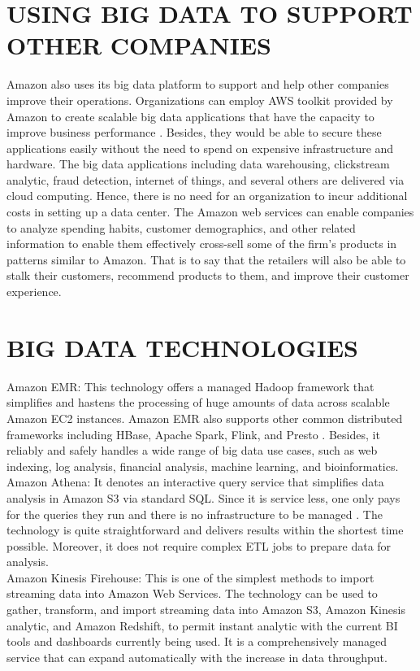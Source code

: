 \documentclass[sigconf]{acmart}
\begin{document}
\section{USING BIG DATA TO SUPPORT OTHER COMPANIES}
Amazon also uses its big data platform to support and help other companies improve their operations. Organizations can employ AWS toolkit provided by Amazon to create scalable big data applications that have the capacity to improve business performance \cite{1}. Besides, they would be able to secure these applications easily without the need to spend on expensive infrastructure and hardware. The big data applications including data warehousing, clickstream analytic, fraud detection, internet of things, and several others are delivered via cloud computing. Hence, there is no need for an organization to incur additional costs in setting up a data center. The Amazon web services can enable companies to analyze spending habits, customer demographics, and other related information to enable them effectively cross-sell some of the firm’s products in patterns similar to Amazon. That is to say that the retailers will also be able to stalk their customers, recommend products to them, and improve their customer experience.

\section{BIG DATA TECHNOLOGIES}
Amazon EMR: This technology offers a managed Hadoop framework that simplifies and hastens the processing of huge amounts of data across scalable Amazon EC2 instances. Amazon EMR also supports other common distributed frameworks including HBase, Apache Spark, Flink, and Presto \cite{Amazon2017}.  Besides, it reliably and safely handles a wide range of big data use cases, such as web indexing, log analysis, financial analysis, machine learning, and bioinformatics. \\

Amazon Athena: It denotes an interactive query service that simplifies data analysis in Amazon S3 via standard SQL. Since it is service less, one only pays for the queries they run and there is no infrastructure to be managed \cite{Amazon2017}. The technology is quite straightforward and delivers results within the shortest time possible. Moreover, it does not require complex ETL jobs to prepare data for analysis. \\

Amazon Kinesis Firehouse: This is one of the simplest methods to import streaming data into Amazon Web Services. The technology can be used to gather, transform, and import streaming data into Amazon S3, Amazon Kinesis analytic, and Amazon Redshift, to permit instant analytic with the current BI tools and dashboards currently being used.  It is a comprehensively managed service that can expand automatically with the increase in data throughput. 
\end{document}
